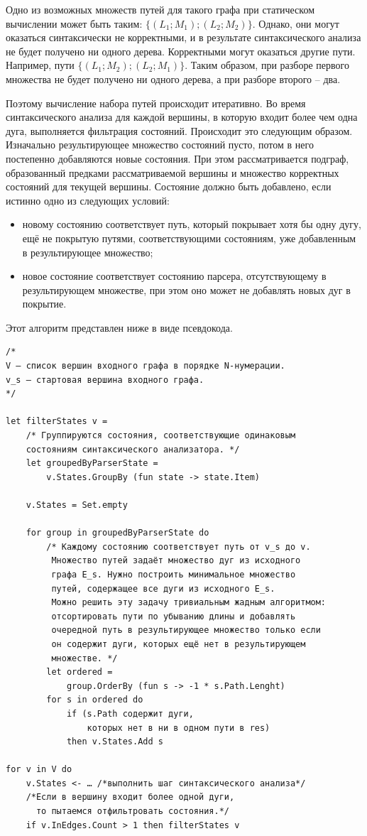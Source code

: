 \documentclass{llncs}
\begin{document}
Одно из возможных множеств путей для такого графа при статическом вычислении может быть таким: $\{(L_1; M_1); (L_2; M_2)\}$. Однако, они могут оказаться синтаксически не корректными, и в результате синтаксического анализа не будет получено ни одного дерева. Корректными могут оказаться другие пути. Например, пути $\{(L_1; M_2); (L_2; M_1)\}$. Таким образом, при разборе первого множества не будет получено ни одного дерева, а при разборе второго -- два.

Поэтому вычисление набора путей происходит итеративно. Во время синтаксического анализа для каждой вершины, в которую входит более чем одна дуга, выполняется фильтрация состояний. Происходит это следующим образом. Изначально результирующее множество состояний пусто, потом в него постепенно добавляются новые состояния. При этом рассматривается подграф, образованный предками рассматриваемой вершины и множество корректных состояний для текущей вершины. Состояние должно быть добавлено, если истинно одно из следующих условий: 
\begin{itemize}
    \item новому состоянию соответствует путь, который покрывает хотя бы одну дугу, ещё не покрытую путями, соответствующими состояниям, уже добавленным в результирующее множество;
    \item новое состояние соответствует состоянию парсера, отсутствующему в результирующем множестве, при этом оно может не добавлять новых дуг в покрытие.
\end{itemize}

Этот алгоритм представлен ниже в виде псевдокода. 
\begin{verbatim}
/*
V – список вершин входного графа в порядке N-нумерации.
v_s – стартовая вершина входного графа.
*/

let filterStates v =
    /* Группируются состояния, соответствующие одинаковым 
    состояниям синтаксического анализатора. */
    let groupedByParserState =
        v.States.GroupBy (fun state -> state.Item)

    v.States = Set.empty

    for group in groupedByParserState do
        /* Каждому состоянию соответствует путь от v_s до v.
         Множество путей задаёт множество дуг из исходного 
         графа E_s. Нужно построить минимальное множество 
         путей, содержащее все дуги из исходного E_s.
         Можно решить эту задачу тривиальным жадным алгоритмом:
         отсортировать пути по убыванию длины и добавлять 
         очередной путь в результирующее множество только если
         он содержит дуги, которых ещё нет в результирующем 
         множестве. */
        let ordered = 
            group.OrderBy (fun s -> -1 * s.Path.Lenght)
        for s in ordered do
            if (s.Path содержит дуги, 
                которых нет в ни в одном пути в res) 
            then v.States.Add s

for v in V do
    v.States <- … /*выполнить шаг синтаксического анализа*/
    /*Если в вершину входит более одной дуги,
      то пытаемся отфильтровать состояния.*/
    if v.InEdges.Count > 1 then filterStates v

\end{verbatim}
\end{document}
